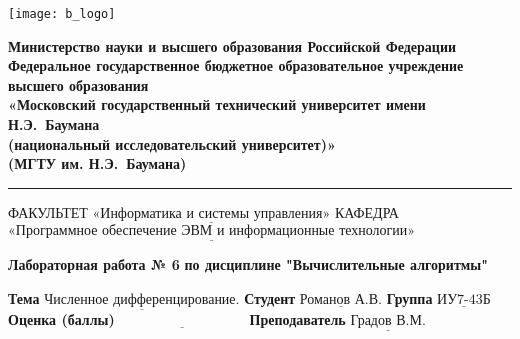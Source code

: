 \documentclass[a4paper,12pt]{article}
\begin{document}
\thispagestyle{empty}

\noindent \begin{minipage}{0.15\textwidth}
	\texttt{[image: b\_logo]}
\end{minipage}
\noindent\begin{minipage}{0.9\textwidth}\centering
	\textbf{Министерство науки и высшего образования Российской Федерации}\\
	\textbf{Федеральное государственное бюджетное образовательное учреждение высшего образования}\\
	\textbf{«Московский государственный технический университет имени Н.Э.~Баумана}\\
	\textbf{(национальный исследовательский университет)»}\\
	\textbf{(МГТУ им. Н.Э.~Баумана)}
\end{minipage}

\noindent\rule{18cm}{3pt}
\newline\newline
\noindent ФАКУЛЬТЕТ $\underline{\text{«Информатика и системы управления»}}$ \newline\newline
\noindent КАФЕДРА $\underline{\text{«Программное обеспечение ЭВМ и информационные технологии»}}$\newline\newline\newline\newline\newline\newline\newline


\begin{center}
	\noindent\begin{minipage}{1.3\textwidth}\centering
	\Large\textbf{  Лабораторная работа № 6}\newline
	\textbf{по дисциплине "Вычислительные алгоритмы"}\newline\newline\newline
	\end{minipage}
\end{center}

\noindent\textbf{Тема} $\underline{\text{Численное дифференцирование.}}$\newline\newline
\noindent\textbf{Студент} $\underline{\text{Романов А.В.}}$\newline\newline
\noindent\textbf{Группа} $\underline{\text{ИУ7-43Б}}$\newline\newline
\noindent\textbf{Оценка (баллы)} $\underline{\text{~~~~~~~~~~~~~~~~~~~~~~~~~~~}}$\newline\newline
\noindent\textbf{Преподаватель} $\underline{\text{Градов В.М.}}$\newline
\end{document}
